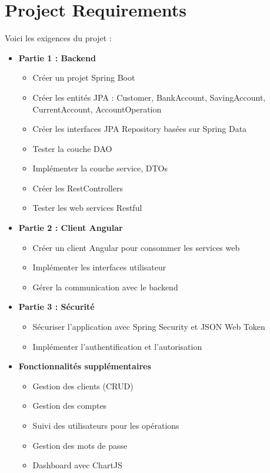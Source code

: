 \documentclass[12pt,a4paper]{report}
\begin{document}
\section{Project Requirements}
Voici les exigences du projet :

\begin{itemize}
    \item \textbf{Partie 1 : Backend}
    \begin{itemize}
        \item Créer un projet Spring Boot
        \item Créer les entités JPA : Customer, BankAccount, SavingAccount, CurrentAccount, AccountOperation
        \item Créer les interfaces JPA Repository basées sur Spring Data
        \item Tester la couche DAO
        \item Implémenter la couche service, DTOs
        \item Créer les RestControllers
        \item Tester les web services Restful
    \end{itemize}
    
    \item \textbf{Partie 2 : Client Angular}
    \begin{itemize}
        \item Créer un client Angular pour consommer les services web
        \item Implémenter les interfaces utilisateur
        \item Gérer la communication avec le backend
    \end{itemize}
    
    \item \textbf{Partie 3 : Sécurité}
    \begin{itemize}
        \item Sécuriser l'application avec Spring Security et JSON Web Token
        \item Implémenter l'authentification et l'autorisation
    \end{itemize}
    
    \item \textbf{Fonctionnalités supplémentaires}
    \begin{itemize}
        \item Gestion des clients (CRUD)
        \item Gestion des comptes
        \item Suivi des utilisateurs pour les opérations
        \item Gestion des mots de passe
        \item Dashboard avec ChartJS
    \end{itemize}
\end{itemize}
\end{document}
